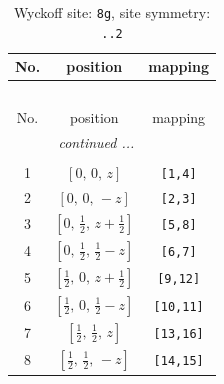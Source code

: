 \documentclass[fleqn,8pt]{jsarticle}
\begin{document}
\begin{longtable}{ccc}
\caption{Wyckoff site: {\tt 8g}, site symmetry: {\tt ..2}}
 \\
 \hline \hline
No. & position & mapping \\ \hline \endfirsthead

\multicolumn{2}{l}{\tablename\ \thetable{}} \\
 \hline \hline
No. & position & mapping \\ \hline \endhead

 \hline \hline
\multicolumn{2}{r}{\footnotesize\it continued ...} \\ \endfoot

 \hline \hline
\multicolumn{2}{r}{} \\ \endlastfoot

1 & $\left[ 0,\, 0,\, z \right]$ & {\tt [1,4]} \\ \hline
2 & $\left[ 0,\, 0,\, - z \right]$ & {\tt [2,3]} \\ \hline
3 & $\left[ 0,\, \frac{1}{2},\, z + \frac{1}{2} \right]$ & {\tt [5,8]} \\ \hline
4 & $\left[ 0,\, \frac{1}{2},\, \frac{1}{2} - z \right]$ & {\tt [6,7]} \\ \hline
5 & $\left[ \frac{1}{2},\, 0,\, z + \frac{1}{2} \right]$ & {\tt [9,12]} \\ \hline
6 & $\left[ \frac{1}{2},\, 0,\, \frac{1}{2} - z \right]$ & {\tt [10,11]} \\ \hline
7 & $\left[ \frac{1}{2},\, \frac{1}{2},\, z \right]$ & {\tt [13,16]} \\ \hline
8 & $\left[ \frac{1}{2},\, \frac{1}{2},\, - z \right]$ & {\tt [14,15]} \\
\end{longtable}
\renewcommand{\arraystretch}{1.2}
\end{document}
